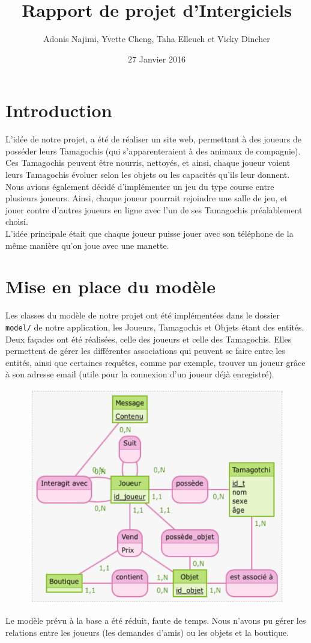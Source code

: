 \documentclass[11pt,a4paper]{report}
\author{Adonis Najimi, Yvette Cheng, Taha Elleuch et Vicky Dincher}
\title{Rapport de projet d'Intergiciels}
\date{27 Janvier 2016}
\begin{document}
\maketitle
\newpage
 
\section*{Introduction}

L'idée de notre projet, a été de réaliser un site web, permettant à des joueurs de posséder leurs Tamagochis (qui s'apparenteraient à des animaux de compagnie). Ces Tamagochis peuvent être nourris, nettoyés, et ainsi, chaque joueur voient leurs Tamagochis évoluer selon les objets ou les capacités qu'ils leur donnent. \\
Nous avions également décidé d'implémenter un jeu du type course entre plusieurs joueurs. Ainsi, chaque joueur pourrait rejoindre une salle de jeu, et jouer contre d'autres joueurs en ligne avec l'un de ses Tamagochis préalablement choisi. \\
L'idée principale était que chaque joueur puisse jouer avec son téléphone de la même manière qu'on joue avec une manette.

\section{Mise en place du modèle}

Les classes du modèle de notre projet ont été implémentées dans le dossier \texttt{model/} de notre application, les Joueurs, Tamagochis et Objets étant des entités. \\
Deux façades ont été réalisées, celle des joueurs et celle des Tamagochis. Elles permettent de gérer les différentes associations qui peuvent se faire entre les entités, ainsi que certaines requêtes, comme par exemple, trouver un joueur grâce à son adresse email (utile pour la connexion d'un joueur déjà enregistré).

\begin{figure}[h!]
\begin{center}
\includegraphics[scale=0.5]{Schemabdd.png}
\end{center}
\end{figure}

Le modèle prévu à la base a été réduit, faute de temps. Nous n'avons pu gérer les relations entre les joueurs (les demandes d'amis) ou les objets et la boutique.
\end{document}
